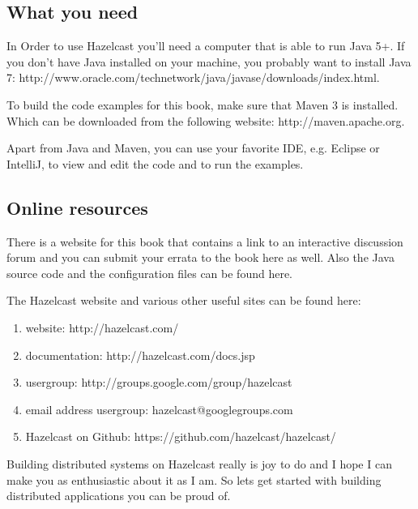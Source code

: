 \subsection*{What you need}
In Order to use Hazelcast you'll need a computer that is able to run Java 5+. If you don't have Java installed on your machine, you probably want to install Java 7: 
http://www.oracle.com/technetwork/java/javase/downloads/index.html. 

To build the code examples for this book, make sure that Maven 3 is installed. Which can be downloaded from the following website: http://maven.apache.org.

Apart from Java and Maven, you can use your favorite IDE, e.g. Eclipse or IntelliJ, to view and edit the code and to run the examples. 

\subsection*{Online resources}
There is a website for this book that contains a link to an interactive discussion forum and you can submit your errata to the book here as well. Also the Java source code and the configuration files can be found here. 

The Hazelcast website and various other useful sites can be found here:
\begin{enumerate}
\item website: http://hazelcast.com/
\item documentation: http://hazelcast.com/docs.jsp
\item usergroup: http://groups.google.com/group/hazelcast
\item email address usergroup: hazelcast@googlegroups.com
\item Hazelcast on Github: https://github.com/hazelcast/hazelcast/
\end{enumerate}
Building distributed systems on Hazelcast really is joy to do and I hope I can make you as enthusiastic about it as I am. So lets get started with building distributed applications you can be proud of.
